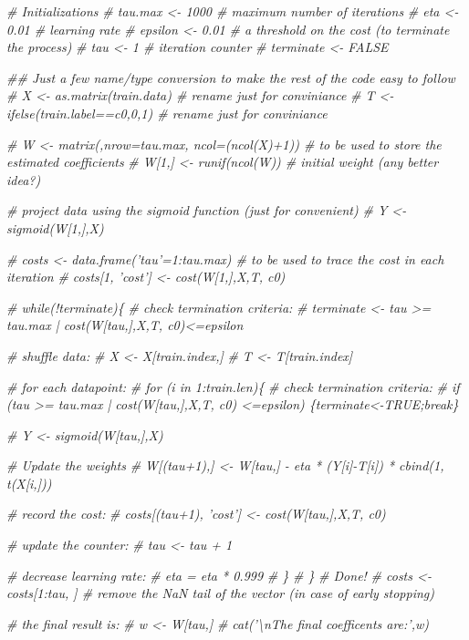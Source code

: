 \documentclass[
]{article}
\newenvironment{Shaded}{\begin{snugshade}}{\end{snugshade}}
\newcommand{\CommentTok}[1]{\textcolor[rgb]{0.56,0.35,0.01}{\textit{#1}}}
\begin{document}
\begin{Shaded}
\begin{Highlighting}[]
\CommentTok{# Initializations}
\CommentTok{# tau.max <- 1000 # maximum number of iterations}
\CommentTok{# eta <- 0.01 # learning rate}
\CommentTok{# epsilon <- 0.01 # a threshold on the cost (to terminate the process)}
\CommentTok{# tau <- 1 # iteration counter}
\CommentTok{# terminate <- FALSE}

\CommentTok{## Just a few name/type conversion to make the rest of the code easy to follow}
\CommentTok{# X <- as.matrix(train.data) # rename just for conviniance}
\CommentTok{# T <- ifelse(train.label==c0,0,1) # rename just for conviniance}

\CommentTok{# W <- matrix(,nrow=tau.max, ncol=(ncol(X)+1)) # to be used to store the estimated coefficients}
\CommentTok{# W[1,] <- runif(ncol(W)) # initial weight (any better idea?)}

\CommentTok{# project data using the sigmoid function (just for convenient)}
\CommentTok{# Y <- sigmoid(W[1,],X)}

\CommentTok{# costs <- data.frame('tau'=1:tau.max)  # to be used to trace the cost in each iteration}
\CommentTok{# costs[1, 'cost'] <- cost(W[1,],X,T, c0)}
\end{Highlighting}
\end{Shaded}

\begin{Shaded}
\begin{Highlighting}[]
\CommentTok{# while(!terminate)\{}
    \CommentTok{# check termination criteria:}
    \CommentTok{# terminate <- tau >= tau.max | cost(W[tau,],X,T, c0)<=epsilon}
    
    \CommentTok{# shuffle data:}
    \CommentTok{# X <- X[train.index,]}
    \CommentTok{# T <- T[train.index]}
    
    \CommentTok{# for each datapoint:}
    \CommentTok{# for (i in 1:train.len)\{}
        \CommentTok{# check termination criteria:}
        \CommentTok{# if (tau >= tau.max | cost(W[tau,],X,T, c0) <=epsilon) \{terminate<-TRUE;break\}}
        
        \CommentTok{# Y <- sigmoid(W[tau,],X)}
            
        \CommentTok{# Update the weights}
        \CommentTok{# W[(tau+1),] <- W[tau,] - eta * (Y[i]-T[i]) * cbind(1, t(X[i,]))}
        
        \CommentTok{# record the cost:}
        \CommentTok{# costs[(tau+1), 'cost'] <- cost(W[tau,],X,T, c0)}
        
        \CommentTok{# update the counter:}
        \CommentTok{# tau <- tau + 1}
        
        \CommentTok{# decrease learning rate:}
        \CommentTok{# eta = eta * 0.999}
    \CommentTok{# \}}
\CommentTok{# \}}
\CommentTok{# Done!}
\CommentTok{# costs <- costs[1:tau, ] # remove the NaN tail of the vector (in case of early stopping)}

\CommentTok{# the  final result is:}
\CommentTok{# w <- W[tau,]}
\CommentTok{# cat('\textbackslash{}nThe  final coefficents are:',w)}
\end{Highlighting}
\end{Shaded}
\end{document}
